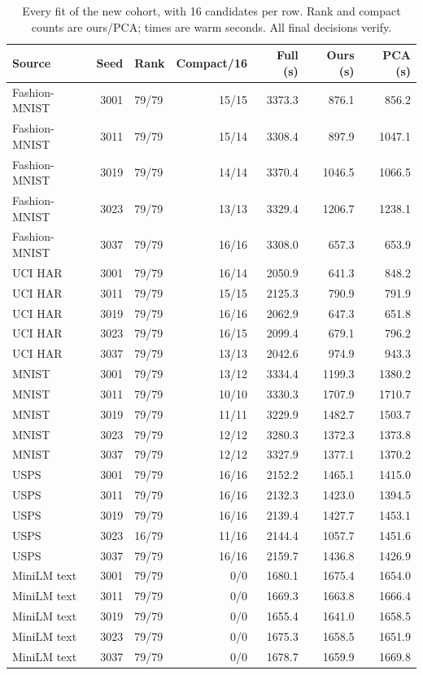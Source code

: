 \documentclass[5p,times,twocolumn]{elsarticle}
\begin{document}
\begin{table}[H]
\centering\small
\caption{Every fit of the new cohort, with 16 candidates per row. Rank and compact counts are ours/PCA; times are warm seconds. All final decisions verify.}
\label{tab:final-perfit}
\begin{tabular}{@{}lrlrrrr@{}}\toprule
Source & Seed & Rank & Compact/16 & Full (s) & Ours (s) & PCA (s)\\
\midrule
Fashion-MNIST & 3001 & 79/79 & 15/15 & 3373.3 & 876.1 & 856.2\\
Fashion-MNIST & 3011 & 79/79 & 15/14 & 3308.4 & 897.9 & 1047.1\\
Fashion-MNIST & 3019 & 79/79 & 14/14 & 3370.4 & 1046.5 & 1066.5\\
Fashion-MNIST & 3023 & 79/79 & 13/13 & 3329.4 & 1206.7 & 1238.1\\
Fashion-MNIST & 3037 & 79/79 & 16/16 & 3308.0 & 657.3 & 653.9\\
UCI HAR & 3001 & 79/79 & 16/14 & 2050.9 & 641.3 & 848.2\\
UCI HAR & 3011 & 79/79 & 15/15 & 2125.3 & 790.9 & 791.9\\
UCI HAR & 3019 & 79/79 & 16/16 & 2062.9 & 647.3 & 651.8\\
UCI HAR & 3023 & 79/79 & 16/15 & 2099.4 & 679.1 & 796.2\\
UCI HAR & 3037 & 79/79 & 13/13 & 2042.6 & 974.9 & 943.3\\
MNIST & 3001 & 79/79 & 13/12 & 3334.4 & 1199.3 & 1380.2\\
MNIST & 3011 & 79/79 & 10/10 & 3330.3 & 1707.9 & 1710.7\\
MNIST & 3019 & 79/79 & 11/11 & 3229.9 & 1482.7 & 1503.7\\
MNIST & 3023 & 79/79 & 12/12 & 3280.3 & 1372.3 & 1373.8\\
MNIST & 3037 & 79/79 & 12/12 & 3327.9 & 1377.1 & 1370.2\\
USPS & 3001 & 79/79 & 16/16 & 2152.2 & 1465.1 & 1415.0\\
USPS & 3011 & 79/79 & 16/16 & 2132.3 & 1423.0 & 1394.5\\
USPS & 3019 & 79/79 & 16/16 & 2139.4 & 1427.7 & 1453.1\\
USPS & 3023 & 16/79 & 11/16 & 2144.4 & 1057.7 & 1451.6\\
USPS & 3037 & 79/79 & 16/16 & 2159.7 & 1436.8 & 1426.9\\
MiniLM text & 3001 & 79/79 & 0/0 & 1680.1 & 1675.4 & 1654.0\\
MiniLM text & 3011 & 79/79 & 0/0 & 1669.3 & 1663.8 & 1666.4\\
MiniLM text & 3019 & 79/79 & 0/0 & 1655.4 & 1641.0 & 1658.5\\
MiniLM text & 3023 & 79/79 & 0/0 & 1675.3 & 1658.5 & 1651.9\\
MiniLM text & 3037 & 79/79 & 0/0 & 1678.7 & 1659.9 & 1669.8\\
\bottomrule
\end{tabular}
\end{table}
\end{document}
